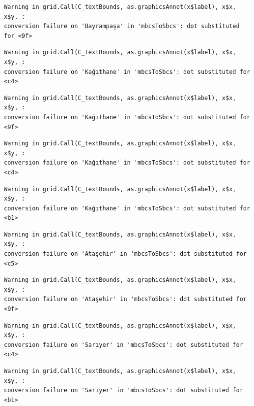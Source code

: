 \documentclass[
  11pt,
  a4paper,
  DIV=11,
  numbers=noendperiod]{scrartcl}
\begin{document}
\begin{verbatim}
Warning in grid.Call(C_textBounds, as.graphicsAnnot(x$label), x$x, x$y, :
conversion failure on 'Bayrampaşa' in 'mbcsToSbcs': dot substituted for <9f>
\end{verbatim}

\begin{verbatim}
Warning in grid.Call(C_textBounds, as.graphicsAnnot(x$label), x$x, x$y, :
conversion failure on 'Kağıthane' in 'mbcsToSbcs': dot substituted for <c4>
\end{verbatim}

\begin{verbatim}
Warning in grid.Call(C_textBounds, as.graphicsAnnot(x$label), x$x, x$y, :
conversion failure on 'Kağıthane' in 'mbcsToSbcs': dot substituted for <9f>
\end{verbatim}

\begin{verbatim}
Warning in grid.Call(C_textBounds, as.graphicsAnnot(x$label), x$x, x$y, :
conversion failure on 'Kağıthane' in 'mbcsToSbcs': dot substituted for <c4>
\end{verbatim}

\begin{verbatim}
Warning in grid.Call(C_textBounds, as.graphicsAnnot(x$label), x$x, x$y, :
conversion failure on 'Kağıthane' in 'mbcsToSbcs': dot substituted for <b1>
\end{verbatim}

\begin{verbatim}
Warning in grid.Call(C_textBounds, as.graphicsAnnot(x$label), x$x, x$y, :
conversion failure on 'Ataşehir' in 'mbcsToSbcs': dot substituted for <c5>
\end{verbatim}

\begin{verbatim}
Warning in grid.Call(C_textBounds, as.graphicsAnnot(x$label), x$x, x$y, :
conversion failure on 'Ataşehir' in 'mbcsToSbcs': dot substituted for <9f>
\end{verbatim}

\begin{verbatim}
Warning in grid.Call(C_textBounds, as.graphicsAnnot(x$label), x$x, x$y, :
conversion failure on 'Sarıyer' in 'mbcsToSbcs': dot substituted for <c4>
\end{verbatim}

\begin{verbatim}
Warning in grid.Call(C_textBounds, as.graphicsAnnot(x$label), x$x, x$y, :
conversion failure on 'Sarıyer' in 'mbcsToSbcs': dot substituted for <b1>
\end{verbatim}
\end{document}
